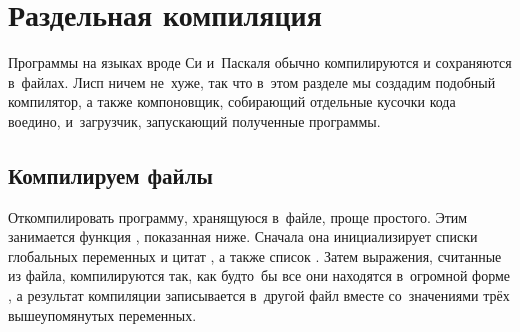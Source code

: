 \section{Раздельная компиляция}\label{compilation/sect:separate}

Программы на языках вроде Си и~Паскаля обычно компилируются и сохраняются
в~файлах. Лисп ничем не~хуже, так что в~этом разделе мы создадим подобный
компилятор, а также компоновщик, собирающий отдельные кусочки кода воедино,
и~загрузчик, запускающий полученные программы.


\subsection{Компилируем файлы}\label{compilation/separate/ssect:files}

Откомпилировать программу, хранящуюся в~файле, проще простого. Этим занимается
функция , показанная ниже. Сначала она инициализирует списки
глобальных переменных  и цитат , а также список
. Затем выражения, считанные из файла, компилируются
так, как будто~бы все они находятся в~огромной форме , а
результат компиляции записывается в~другой файл вместе со~значениями трёх
вышеупомянутых переменных.

